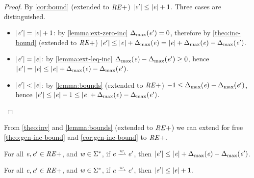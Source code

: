 \begin{proof}
 By \cref{cor:bound} (extended to $\mathit {RE+}$) ${\mid}{\mathit {e}'}{\mid}\leq{\mid}{\ensuremath{\mathit {e}}}{\mid}+ 1$.
 Three cases are distinguished.
 \begin{itemize}
  \item ${\mid}{\mathit {e}'}{\mid}={\mid}{\mathit {e}}{\mid}+1$: by \cref{lemma:ext-zero-inc}
        ${\Delta_{\max}}({\mathit {e}'})=0$, therefore by \cref{theo:inc-bound} (extended to $\mathit {RE+}$) ${\mid}{\mathit {e}'}{\mid}\leq{\mid}{\ensuremath{\mathit {e}}}{\mid}+{\Delta_{\max}}({\mathit {e}})={\mid}{\mathit {e}}{\mid}+{\Delta_{\max}}({\mathit {e}})-{\Delta_{\max}}({\mathit {e}'})$.
  \item ${\mid}{\mathit {e}'}{\mid}={\mid}{\mathit {e}}{\mid}$: by \cref{lemma:ext-leq-inc} ${\Delta_{\max}}({\mathit {e}})-{\Delta_{\max}}({\mathit {e}'})\geq 0$, hence
        ${\mid}{\mathit {e}'}{\mid}={\mid}{\mathit {e}}{\mid}\leq{\mid}{\ensuremath{\mathit {e}}}{\mid}+{\Delta_{\max}}({\mathit {e}})-{\Delta_{\max}}({\mathit {e}'})$.
  \item ${\mid}{\mathit {e}'}{\mid}<{\mid}{\mathit {e}}{\mid}$: by \cref{lemma:bounds} (extended to $\mathit {RE+}$) $-1\leq{\Delta_{\max}}({\mathit {e}})-{\Delta_{\max}}({\mathit {e}'})$, hence
        ${\mid}{\mathit {e}'}{\mid}\leq{\mid}{\ensuremath{\mathit {e}}}{\mid}-1\leq{\mid}{\ensuremath{\mathit {e}}}{\mid}+{\Delta_{\max}}({\mathit {e}})-{\Delta_{\max}}({\mathit {e}'})$.
 \end{itemize}
\end{proof}

From \cref{theo:inv} and \cref{lemma:bounds} (extended to $\mathit {RE+}$) we can
extend for free \cref{theo:gen-inc-bound} and \cref{cor:gen-inc-bound}  to $\mathit {RE+}$.

\begin{theorem}
 For all $\mathit {e},\mathit {e}'\in\mathit {RE+}$, and $\mathit {w}\in\Sigma^*$, if $\re\parDer{\word}\re'$, then ${\mid}{\mathit {e}'}{\mid}\leq{\mid}{\ensuremath{\mathit {e}}}{\mid}+{\Delta_{\max}}({\mathit {e}})-{\Delta_{\max}}({\mathit {e}'})$.
\end{theorem}

\begin{corollary}
 For all $\mathit {e},\mathit {e}'\in\mathit {RE+}$, and $\mathit {w}\in\Sigma^*$, if $\re\parDer{\word}\re'$, then ${\mid}{\mathit {e}'}{\mid}\leq{\mid}{\ensuremath{\mathit {e}}}{\mid}+1$.
\end{corollary}




